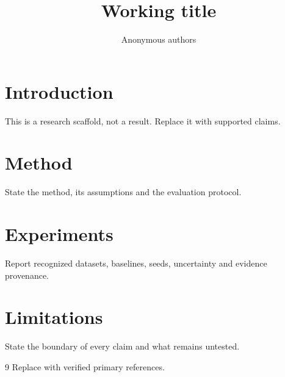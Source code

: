 \documentclass{article}
\title{Working title}
\author{Anonymous authors}
\begin{document}
\maketitle
\begin{abstract}

\end{abstract}
\section{Introduction}
This is a research scaffold, not a result. Replace it with supported claims.
\section{Method}
State the method, its assumptions and the evaluation protocol.
\section{Experiments}
Report recognized datasets, baselines, seeds, uncertainty and evidence provenance.
\section{Limitations}
State the boundary of every claim and what remains untested.
\label{crux:main-end}
\begin{thebibliography}{9}
 Replace with verified primary references.
\end{thebibliography}
\end{document}
